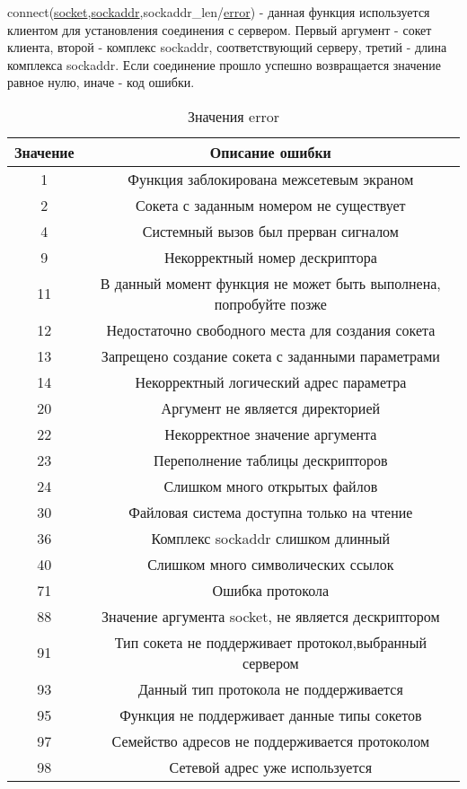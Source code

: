 \documentclass[12t,english,russian]{article}
\begin{document}
\label{connect}
connect(\hyperref[socket]{socket},\hyperref[sockaddr]{sockaddr},sockaddr\_len/\hyperref[error]{error}) - данная функция используется клиентом для установления соединения с сервером. Первый аргумент - сокет клиента, второй - комплекс sockaddr, соответствующий серверу, третий - длина комплекса sockaddr. Если соединение прошло успешно возвращается значение равное нулю, иначе - код ошибки.

\begin{center}
\begin{longtable}{|c|c|}
\caption{\label{error}Значения error}
\\ \hline
Значение & Описание ошибки \\
\hline
1 & Функция заблокирована межсетевым экраном\\
2 & Сокета с заданным номером не существует\\
4 & Системный вызов был прерван сигналом\\
9 & Некорректный номер дескриптора\\
11 & В данный момент функция не может быть выполнена, попробуйте позже\\
12 & Недостаточно свободного места для создания сокета \\
13 & Запрещено создание сокета с заданными параметрами \\
14 & Некорректный логический адрес параметра\\
20 & Аргумент не является директорией\\
22 & Некорректное значение аргумента\\
23 & Переполнение таблицы дескрипторов\\
24 & Слишком много открытых файлов\\
30 & Файловая система доступна только на чтение\\
36 & Комплекс sockaddr слишком длинный\\
40 & Слишком много символических ссылок \\
71 & Ошибка протокола\\
88 & Значение аргумента socket, не является дескриптором\\
91 & Тип сокета не поддерживает протокол,выбранный сервером\\
93 & Данный тип протокола не поддерживается\\
95 & Функция не поддерживает данные типы сокетов\\
97 & Семейство адресов не поддерживается протоколом\\
98 & Сетевой адрес уже используется\\

\end{longtable}
\end{center}
\end{document}

